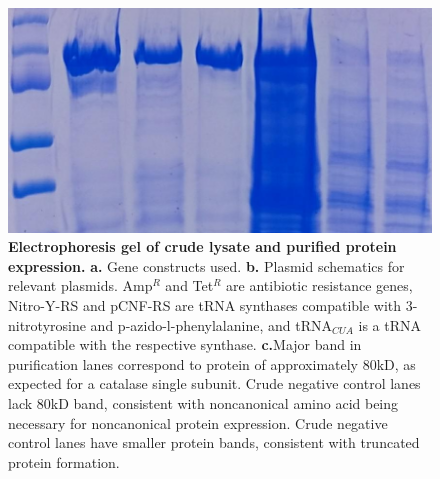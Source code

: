 \documentclass[9pt,twocolumn,twoside]{pnas-new}
\begin{document}
\begin{figure}
  \centering
  \includegraphics[width=\linewidth]{figures/pure-gel}
  \caption{\textbf{Electrophoresis gel of crude lysate and purified protein expression.} \textbf{a.} Gene constructs used. \textbf{b.} Plasmid schematics for relevant plasmids. Amp$^R$ and Tet$^R$ are antibiotic resistance genes, Nitro-Y-RS and pCNF-RS are tRNA synthases compatible with 3-nitrotyrosine and p-azido-l-phenylalanine, and tRNA$_{CUA}$ is a tRNA compatible with the respective synthase. \textbf{c.}Major band in purification lanes correspond to protein of approximately 80kD, as expected for a catalase single subunit. Crude negative control lanes lack 80kD band, consistent with noncanonical amino acid being necessary for noncanonical protein expression. Crude negative control lanes have smaller protein bands, consistent with truncated protein formation.}
  \label{fig:pure-gel}
\end{figure}
\end{document}
